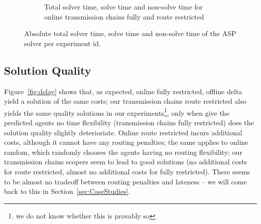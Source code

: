 \documentclass{article}
\begin{document}
\begin{figure}
\begin{subfigure}{\textwidth}
        \caption{Total solver time, solve time and non-solve time for online transmission chains fully and route restricted}
        \label{fig:computationtimes_solve_non_solve_time_online_tranmission_chains}
    \end{subfigure}
	\caption{Absolute total solver time, solve time and non-solve time of the ASP solver per experiment id.}
	\label{fig:solve_non_solve}
\end{figure}



\subsection{Solution Quality}

Figure~\ref{fig:delay} shows that, as expected, online fully restricted, offline delta yield a solution of the same costs; our transmission chains route restricted also yields the same quality solutions in our experiments\footnote{we do not know whether this is provably so}, only when give the predicted agents no time flexibility (transmission chains fully restricted) does the solution quality slightly deterioriate. Online route restricted incurs additional costs, although it cannot have any routing penalties; the same applies to online random, which randomly chooses the agents having no routing flexibility; our transmission chains scopers seem to lead to good solutions (no additional costs for route restricted, almost no additional costs for fully restricted). There seems to be almost no tradeoff between routing penalties and lateness -- we will come back to this in Section~\ref{sec:CaseStudies}.
\end{document}
